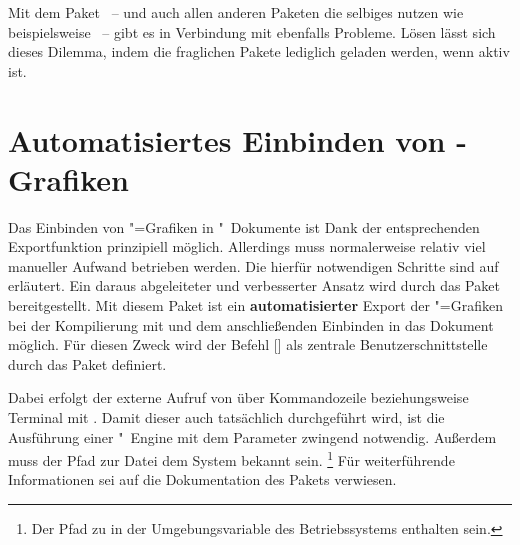 Mit dem Paket ~-- und auch allen anderen Paketen die 
selbiges nutzen wie beispielsweise ~-- gibt es in Verbindung 
mit  ebenfalls Probleme. Lösen lässt sich dieses Dilemma, 
indem die fraglichen Pakete lediglich geladen werden, wenn  
aktiv ist.
%
\begin{quoting}[rightmargin=0pt]
\begin{Code}
\ifpdf
  \usepackage{tikz}%
\fi
\end{Code}
\end{quoting}



\section{Automatisiertes Einbinden von -Grafiken }
%
%
%
Das Einbinden von "=Grafiken in "~Dokumente
ist Dank der entsprechenden Exportfunktion prinzipiell möglich. Allerdings muss 
normalerweise relativ viel manueller Aufwand betrieben werden. Die hierfür 
notwendigen Schritte sind auf  erläutert. Ein daraus 
abgeleiteter und verbesserter Ansatz wird durch das Paket  
bereitgestellt. Mit diesem Paket ist ein \textbf{automatisierter} Export der 
"=Grafiken bei der Kompilierung mit  
und dem anschließenden Einbinden in das Dokument möglich. Für diesen Zweck wird 
der Befehl [] als 
zentrale Benutzerschnittstelle durch das Paket definiert.

Dabei erfolgt der externe Aufruf von  über Kommandozeile 
beziehungsweise Terminal mit . Damit dieser auch tatsächlich 
durchgeführt wird, ist die Ausführung einer "~Engine mit dem
Parameter  zwingend notwendig. Außerdem muss der Pfad 
zur Datei  dem System bekannt sein.%
\footnote{%
  Der Pfad zu  in der Umgebungsvariable  des 
  Betriebssystems enthalten sein.%
}
Für weiterführende Informationen sei auf die Dokumentation des Pakets 
 verwiesen.



